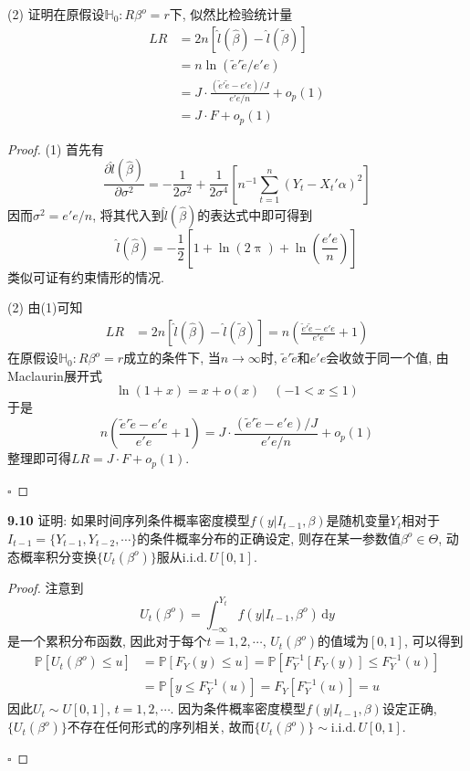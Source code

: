 \documentclass[cn,12pt,math=mtpro2,citestyle=gb7714-2015,bibstyle=gb7714-2015,twocol,mode=simple]{elegantbook}
\newcommand{\HH}{\mathbb{H}}
\newcommand{\hbeta}{\hat{\beta}}
\newcommand{\tbeta}{\tilde{\beta}}
\begin{document}
(2) 证明在原假设$\HH_0:R\beta^o=r$下, 似然比检验统计量
\begin{align*}
LR&=2n[\hat{l}(\hbeta)-\hat{l}(\tbeta)] \\
&=n\ln(\tilde{e}'\tilde{e}/e'e) \\
&=J\cdot\frac{(\tilde{e}'\tilde{e}-e'e)/J}{e'e/n}+o_p(1) \\
&=J\cdot F+o_p(1)
\end{align*}
\begin{proof}
  (1) 首先有
  $$\frac{\partial \hat{l}(\hbeta)}{\partial\sigma^2}=-\frac{1}{2\sigma^2}+\frac{1}{2\sigma^4}\left[ n^{-1}\sum_{t=1}^{n}(Y_t-X_t'\alpha)^2\right]$$
  因而$\sigma^2=e'e/n$, 将其代入到$\hat{l}(\hbeta)$的表达式中即可得到
  $$\hat{l}(\hbeta)=-\frac{1}{2}\left[1+\ln(2\uppi)+\ln\left(\frac{e'e}{n}\right)\right]$$
  类似可证有约束情形的情况.

  (2) 由(1)可知
  \begin{align*}
  LR&=2n[\hat{l}(\hbeta)-\hat{l}(\tbeta)]=n\left(\frac{\tilde{e}'\tilde{e}-e'e}{e'e}+1\right)
  \end{align*}
  在原假设$\HH_0:R\beta^o=r$成立的条件下, 当$n\to\infty$时, $\tilde{e}'\tilde{e}$和$e'e$会收敛于同一个值, 由Maclaurin展开式
  $$\ln(1+x)=x+o(x)\quad (-1<x\leq 1)$$
  于是
  $$n\left(\frac{\tilde{e}'\tilde{e}-e'e}{e'e}+1\right)=J\cdot\frac{(\tilde{e}'\tilde{e}-e'e)/J}{e'e/n}+o_p(1)$$
  整理即可得$LR=J\cdot F+o_p(1)$.

  $\square$
\end{proof}
\textbf{9.10} 证明: 如果时间序列条件概率密度模型$f(y|I_{t-1},\beta)$是随机变量$Y_t$相对于$I_{t-1}=\{Y_{t-1},Y_{t-2},\cdots\}$的条件概率分布的正确设定, 则存在某一参数值$\beta^o\in\Theta$, 动态概率积分变换$\{U_t(\beta^o)\}$服从$\text{i.i.d.}\,U[0,1]$.
\begin{proof}
  注意到
  $$\displaystyle U_t(\beta^o)=\int_{-\infty}^{Y_t}f(y|I_{t-1},\beta^o)\,\text{d}y$$
  是一个累积分布函数, 因此对于每个$t=1,2,\cdots$, $U_t(\beta^o)$的值域为$[0,1]$, 可以得到
  \begin{align*}
  \mathbb{P}[U_t(\beta^o)\leq u]&=\mathbb{P}[F_Y(y)\leq u]=\mathbb{P}[F_Y^{-1}[F_Y(y)]\leq F_Y^{-1}(u)] \\
  &=\mathbb{P}[y\leq F_Y^{-1}(u)]=F_Y[F_Y^{-1}(u)]=u
  \end{align*}
  因此$U_t\sim U[0,1]$, $t=1,2,\cdots$. 因为条件概率密度模型$f(y|I_{t-1},\beta)$设定正确, $\{U_t(\beta^o)\}$不存在任何形式的序列相关, 故而$\{U_t(\beta^o)\}\sim\text{i.i.d.}\,U[0,1]$.

  $\square$
\end{proof}
\end{document}
